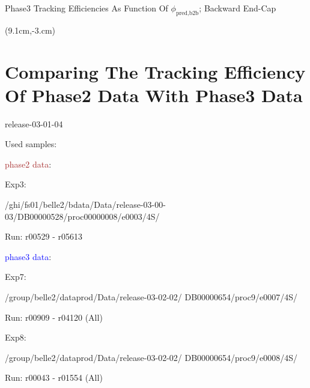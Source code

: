 \documentclass[8pt]{beamer}
\begin{document}
\begin{frame}{Phase3 Tracking Efficiencies As Function Of $\phi_{\textrm{pred,b2b}}$; Backward End-Cap}
	
			\begin{textblock*}{5cm}(9.1cm,-3.cm)
	\end{textblock*}
	
	\pause[4]
	
	
	
\end{frame}




\section{Comparing The Tracking Efficiency Of Phase2 Data With Phase3 Data}


{
	\begin{frame}[noframenumbering]
		\sectionpage
		\begin{itemize}
			\normalsize{
				
				\item release-03-01-04
				\item Used samples:
				\begin{itemize}
					\normalsize{
					
					\item \textcolor{brown}{phase2 data}:
						\begin{itemize}
							\normalsize{
							\item Exp3:
								
								/ghi/fs01/belle2/bdata/Data/release-03-00-03/DB00000528/proc00000008/e0003/4S/
								
								Run: r00529 - r05613
							}
						\end{itemize}
					
						\item[] \textcolor{blue}{phase3 data}: 
						\begin{itemize}
							\normalsize{
								\item Exp7:
								
								/group/belle2/dataprod/Data/release-03-02-02/ DB00000654/proc9/e0007/4S/
								
								Run: r00909 - r04120 (All)
								
								\item Exp8:
								
								/group/belle2/dataprod/Data/release-03-02-02/ DB00000654/proc9/e0008/4S/
								
								Run: r00043 - r01554 (All)
								
							}
						\end{itemize}

					}
				\end{itemize}
			}
		\end{itemize}
		
		
	\end{frame}
	
}
\end{document}
